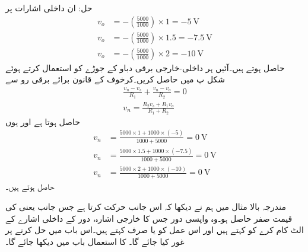 حل:
ان داخلی اشارات پر
\begin{align*}
v_o&=-\left(\frac{5000}{1000}\right) \times 1=\SI{-5}{\volt}\\
 v_o&=-\left(\frac{5000}{1000}\right) \times 1.5=\SI{-7.5}{\volt}\\
v_o&=-\left(\frac{5000}{1000}\right) \times 2=\SI{-10}{\volt}
\end{align*}
حاصل ہوتے ہیں۔آئیں ہر داخلی-خارجی برقی دباو کے جوڑے کو استعمال کرتے ہوئے شکل  پ میں  حاصل کریں۔کرخوف کے قانون برائے برقی رو سے
\begin{align*}
\frac{v_n-v_s}{R_1}+\frac{v_n-v_o}{R_2}=0\\
v_n=\frac{R_2 v_s +R_1 v_o}{R_1+R_2}
\end{align*}
حاصل ہوتا ہے اور یوں
\begin{align*}
v_n&=\frac{5000 \times 1 +1000 \times (-5)}{1000+5000}=\SI{0}{\volt}\\
v_n&=\frac{5000 \times 1.5 +1000 \times (-7.5)}{1000+5000}=\SI{0}{\volt}\\
v_n&=\frac{5000 \times 2 +1000 \times (-10)}{1000+5000}=\SI{0}{\volt}
\end{align*}
حاصل ہوتے ہیں۔

مندرجہ بالا مثال میں ہم نے دیکھا کہ  اس جانب حرکت کرتا ہے جس جانب  یعنی  کی قیمت صفر حاصل ہو۔وہ واپسی دور جس کا خارجی اشارہ، دور کے داخلی اشارے کے الٹ کام کرے کو  کہتے ہیں اور اس عمل کو  یا صرف  کہتے ہیں۔اس باب میں  حل کرنے پر غور کیا جائے گا۔ کا استعمال باب  میں دیکھا جائے گا۔  
 
